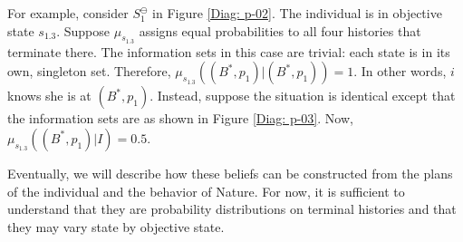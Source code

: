 \documentclass[
11pt,
titlepage,
reqno,
]{article}%
\theoremstyle{definition}
\begin{document}
For example, consider $S^\ominus_1$ in Figure \ref{Diag: p-02}. 
The individual is in objective state $s_{1.3}$.
Suppose $\mu_{s_{1.3}}$ assigns equal probabilities to all four histories that terminate there.
The information sets in this case are trivial: each state is in its own, singleton set.
Therefore,  $\mu_{s_{1.3}}((B^\ast,p_1)|(B^\ast,p_1))=1$.
In other words, $i$ knows she is at $(B^\ast,p_1)$.
Instead, suppose the situation is identical except that the information sets are as shown in Figure \ref{Diag: p-03}.
Now, $\mu_{s_{1.3}}((B^\ast,p_1)|I)=0.5$.

Eventually, we will describe how these beliefs can be constructed from the plans of the individual and the behavior of Nature. 
For now, it is sufficient to understand that they are probability distributions on terminal histories and that they may vary state by objective state.
\end{document}
